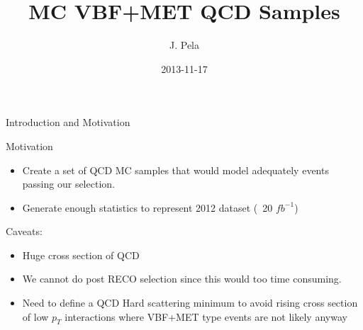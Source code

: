 \documentclass[8pt]{beamer}
\author[João Pela]{J. Pela}
\title[]{MC VBF+MET QCD Samples}
\institute{Imperial College London}
\date{2013-11-17}
\begin{document}
\setlength{\unitlength}{1mm}

\begin{frame}
  \titlepage
\end{frame}

\begin{frame}{Introduction and Motivation}

\begin{block}{Motivation}

  \begin{itemize}
    \item Create a set of QCD MC samples that would model adequately events passing our selection.
    \item Generate enough statistics to represent 2012 dataset (~20 $fb^{-1}$)
  \end{itemize}
  
\end{block}

\begin{block}{Caveats:}

  \begin{itemize}
    \item Huge cross section of QCD
    \item We cannot do post RECO selection since this would too time consuming.
    \item Need to define a QCD Hard scattering minimum to avoid rising cross section of low $p_T$
          interactions where VBF+MET type events are not likely anyway
  \end{itemize}
  
\end{block}

\end{frame}
\end{document}
